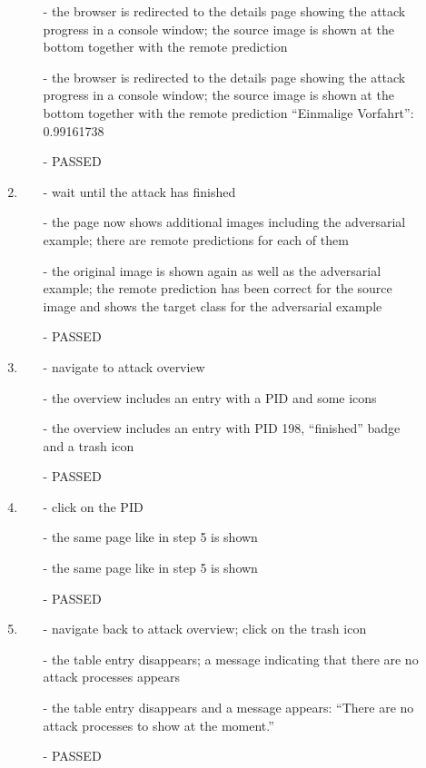 \begin{description}
\begin{enumerate}
\begin{itemize}
			\item [-] the browser is redirected to the details page showing the attack progress in a console window; the source image is shown at the bottom together with the remote prediction
			\item [-] the browser is redirected to the details page showing the attack progress in a console window; the source image is shown at the bottom together with the remote prediction \enquote{Einmalige Vorfahrt}: 0.99161738
			\item [-] PASSED
		\end{itemize}
		\item  
		\begin{itemize}
			\item [-] wait until the attack has finished
			\item [-] the page now shows additional images including the adversarial example; there are remote predictions for each of them
			\item [-] the original image is shown again as well as the adversarial example; the remote prediction has been correct for the source image and shows the target class for the adversarial example
			\item [-] PASSED
		\end{itemize}
		\item  
		\begin{itemize}
			\item [-] navigate to attack overview
			\item [-] the overview includes an entry with a PID and some icons
			\item [-] the overview includes an entry with PID 198, \enquote{finished} badge and a trash icon
			\item [-] PASSED
		\end{itemize}
		\item
		\begin{itemize}
			\item [-] click on the PID
			\item [-] the same page like in step 5 is shown
			\item [-] the same page like in step 5 is shown
			\item [-] PASSED
		\end{itemize}
		\item
		\begin{itemize}
			\item [-] navigate back to attack overview; click on the trash icon
			\item [-] the table entry disappears; a message indicating that there are no attack processes appears
			\item [-] the table entry disappears and a message appears: \enquote{There are no attack processes to show at the moment.}
			\item [-] PASSED
		\end{itemize}
	\end{enumerate}
\end{description}